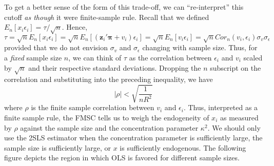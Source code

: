 \documentclass[12pt]{article}\usepackage[]{graphicx}\usepackage[]{color}
\theoremstyle{definition}
\begin{document}
To get a better sense of the form of this trade-off, we can ``re-interpret'' this cutoff \emph{as though} it were finite-sample rule. Recall that we defined $E_n[x_i\epsilon_i]= \tau/\sqrt{n}$. Hence,
  $$\tau = \sqrt{n} E_n[x_i \epsilon_i] = \sqrt{n}E_n\left[\left(\mathbf{z}_i' \mathbf{\pi} + v_i\right)\epsilon_i \right] = \sqrt{n} E_n[v_i\epsilon_i] = \sqrt{n} Cor_n(v_i, \epsilon_i) \sigma_v \sigma_\epsilon$$
provided that we do not envision $\sigma_v$ and $\sigma_\epsilon$ changing with sample size. Thus, for a \emph{fixed} sample size $n$, we can think of $\tau$ as the correlation between $\epsilon_i$ and $v_i$ scaled by $\sqrt{n}$ and their respective standard deviations. Dropping the $n$ subscript on the correlation and substituting into the preceding inequality, we have
  $$|\rho|  < \sqrt{\frac{1}{nR^2}}$$
where $\rho$ is the finite sample correlation between $v_i$ and $\epsilon_i$. Thus, interpreted as a finite sample rule, the FMSC tells us to weigh the endogeneity of $x_i$ as measured by $\rho$ against the sample size and the concentration parameter $\kappa^2$. We should only use the 2SLS estimator when the concentration parameter is sufficiently large, the sample size is sufficiently large, or $x$ is sufficiently endogenous. The following figure depicts the region in which OLS is favored for different sample sizes.

\end{document}
